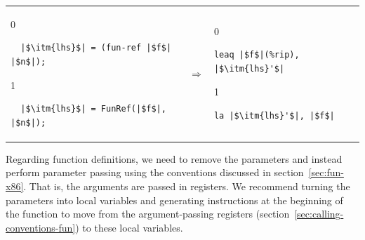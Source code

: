 \documentclass[7x10]{TimesAPriori_MIT}%
\def\racketEd{0}
\def\pythonEd{1}
\def\edition{1}
\def\xeightysixEd{0}
\def\riscvEd{1}
\def\architecture{1}
\newcommand{\pythonColor}[0]{}
\numberwithin{theorem}{chapter}
\numberwithin{definition}{chapter}
\numberwithin{equation}{chapter}
\begin{document}
\begin{center}
  \begin{tabular}{lcl}
\begin{minipage}{0.35\textwidth}
{\if\edition\racketEd
\begin{lstlisting}
  |$\itm{lhs}$| = (fun-ref |$f$| |$n$|);
\end{lstlisting}
\fi}
{\if\edition\pythonEd\pythonColor
\begin{lstlisting}
  |$\itm{lhs}$| = FunRef(|$f$|, |$n$|);
\end{lstlisting}
\fi}
\end{minipage}
&
$\Rightarrow$\qquad\qquad
&
\begin{minipage}{0.3\textwidth}
\if\architecture\xeightysixEd
\begin{lstlisting}
leaq |$f$|(%rip), |$\itm{lhs}'$|
\end{lstlisting}
\fi
\if\architecture\riscvEd
\begin{lstlisting}
la |$\itm{lhs}'$|, |$f$|
\end{lstlisting}
\fi
\end{minipage}
  \end{tabular}
\end{center}


Regarding function definitions, we need to remove the parameters and
instead perform parameter passing using the conventions discussed in
section~\ref{sec:fun-x86}. That is, the arguments are passed in
registers. We recommend turning the parameters into local variables
and generating instructions at the beginning of the function to move
from the argument-passing registers
(section~\ref{sec:calling-conventions-fun}) to these local variables.
\end{document}
